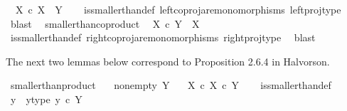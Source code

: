 \begin{isabellebody}
\ \ {\isachardoublequoteopen}X\ {\isasymle}\isactrlsub c\ X\ {\isasymCoprod}\ Y{\isachardoublequoteclose}\isanewline
%
\isadelimproof
\ \ %
\endisadelimproof
%
\isatagproof
{}\isamarkupfalse%
\ is{\isacharunderscore}{\kern0pt}smaller{\isacharunderscore}{\kern0pt}than{\isacharunderscore}{\kern0pt}def\ left{\isacharunderscore}{\kern0pt}coproj{\isacharunderscore}{\kern0pt}are{\isacharunderscore}{\kern0pt}monomorphisms\ left{\isacharunderscore}{\kern0pt}proj{\isacharunderscore}{\kern0pt}type\ \isamarkupfalse%
\ blast%
\endisatagproof
{\isafoldproof}%
%
\isadelimproof
\isanewline
%
\endisadelimproof
\isanewline
{}\isamarkupfalse%
\ \ smaller{\isacharunderscore}{\kern0pt}than{\isacharunderscore}{\kern0pt}coproduct{}{\isacharcolon}{\kern0pt}\isanewline
\ \ {\isachardoublequoteopen}X\ {\isasymle}\isactrlsub c\ Y\ {\isasymCoprod}\ X{\isachardoublequoteclose}\isanewline
%
\isadelimproof
\ \ %
\endisadelimproof
%
\isatagproof
{}\isamarkupfalse%
\ is{\isacharunderscore}{\kern0pt}smaller{\isacharunderscore}{\kern0pt}than{\isacharunderscore}{\kern0pt}def\ right{\isacharunderscore}{\kern0pt}coproj{\isacharunderscore}{\kern0pt}are{\isacharunderscore}{\kern0pt}monomorphisms\ right{\isacharunderscore}{\kern0pt}proj{\isacharunderscore}{\kern0pt}type\ \isamarkupfalse%
\ blast%
\endisatagproof
{\isafoldproof}%
%
\isadelimproof
%
\endisadelimproof
%
\begin{isamarkuptext}%
The next two lemmas below correspond to Proposition 2.6.4 in Halvorson.%
\end{isamarkuptext}\isamarkuptrue%
\isamarkupfalse%
\ smaller{\isacharunderscore}{\kern0pt}than{\isacharunderscore}{\kern0pt}product{}{\isacharcolon}{\kern0pt}\isanewline
\ \ \ {\isachardoublequoteopen}nonempty\ Y{\isachardoublequoteclose}\isanewline
\ \ \ {\isachardoublequoteopen}X\ {\isasymle}\isactrlsub c\ X\ {\isasymtimes}\isactrlsub c\ Y{\isachardoublequoteclose}\isanewline
%
\isadelimproof
\ \ %
\endisadelimproof
%
\isatagproof
{}\isamarkupfalse%
\ is{\isacharunderscore}{\kern0pt}smaller{\isacharunderscore}{\kern0pt}than{\isacharunderscore}{\kern0pt}def\ \ \isanewline
{}\isamarkupfalse%
{\isacharminus}{\kern0pt}\isanewline
\ \ \isamarkupfalse%
\ y\ \ y{\isacharunderscore}{\kern0pt}type{\isacharcolon}{\kern0pt}\ {\isachardoublequoteopen}y\ {\isasymin}\isactrlsub c\ Y{\isachardoublequoteclose}\isanewline
\ \ \isamarkupfalse%

\end{isabellebody}
